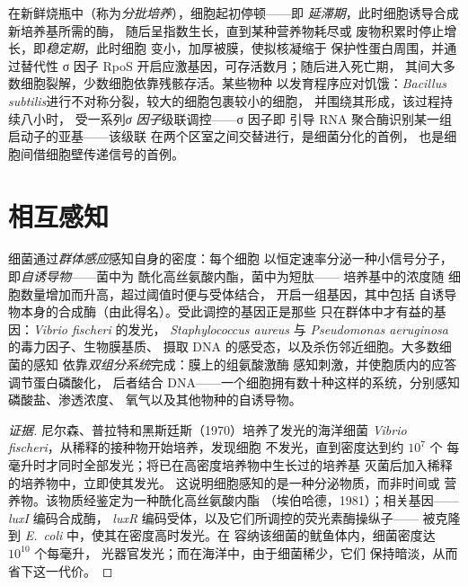 \begin{definition}[时期与状态]\label{def:b3:bacteriology:phases}
在新鲜烧瓶中（称为\emph{分批培养}），细胞起初停顿——即
\emph{延滞期}，此时细胞诱导合成新培养基所需的酶，
随后呈指数生长，直到某种营养物耗尽或
废物积累时停止增长，即\emph{稳定期}，此时细胞
变小，加厚被膜，使拟核凝缩于
保护性蛋白周围，并通过替代性
σ 因子 RpoS 开启应激基因，可存活数月；随后进入死亡期，
其间大多数细胞裂解，少数细胞依靠残骸存活。某些物种
以发育程序应对饥饿：\emph{Bacillus
subtilis}进行不对称分裂，较大的细胞包裹较小的细胞，
并围绕其形成，该过程持续八小时，
受一系列\emph{σ 因子}级联调控——σ 因子即
引导 RNA 聚合酶识别某一组启动子的亚基——该级联
在两个区室之间交替进行，是细菌分化的首例，
也是细胞间借细胞壁传递信号的首例。
\end{definition}

\section{相互感知}

\begin{definition}[群体感应]\label{def:b3:bacteriology:quorum}
细菌通过\emph{群体感应}感知自身的密度：每个细胞
以恒定速率分泌一种小信号分子，即\emph{自诱导物}——菌中为
酰化高丝氨酸内酯，菌中为短肽——
培养基中的浓度随
细胞数量增加而升高，超过阈值时便与受体结合，
开启一组基因，其中包括
自诱导物本身的合成酶（由此得名）。受此调控的基因正是那些
只在群体中才有益的基因：\emph{Vibrio fischeri} 的发光，
\emph{Staphylococcus aureus} 与
\emph{Pseudomonas aeruginosa} 的毒力因子、生物膜基质、
摄取 DNA 的感受态，以及杀伤邻近细胞。大多数细菌的感知
依靠\emph{双组分系统}完成：膜上的组氨酸激酶
感知刺激，并使胞质内的应答调节蛋白磷酸化，
后者结合 DNA——一个细胞拥有数十种这样的系统，分别感知磷酸盐、渗透浓度、
氧气以及其他物种的自诱导物。
\end{definition}

\begin{proof}[证据]
尼尔森、普拉特和黑斯廷斯（1970）培养了发光的海洋细菌
 \emph{Vibrio fischeri}，从稀释的接种物开始培养，发现细胞
不发光，直到密度达到约 $10^{7}$ 个
每毫升时才同时全部发光；将已在高密度培养物中生长过的培养基
灭菌后加入稀释的培养物中，立即使其发光。
这说明细胞感知的是一种分泌物质，而非时间或
营养物。该物质经鉴定为一种酰化高丝氨酸内酯
（埃伯哈德，1981）；相关基因——\emph{luxI} 编码合成酶，
\emph{luxR} 编码受体，以及它们所调控的荧光素酶操纵子——
被克隆到 \emph{E.~coli} 中，使其在密度高时发光。在
容纳该细菌的鱿鱼体内，细菌密度达 $10^{10}$ 个每毫升，
光器官发光；而在海洋中，由于细菌稀少，它们
保持暗淡，从而省下这一代价。
\end{proof}

